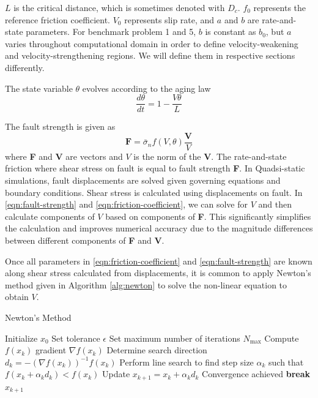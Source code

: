 $L$ is the critical distance, which is sometimes denoted with $D_c$. 
$f_0$ represents the reference friction coefficient. $V_0$ represents slip rate, and $a$ and $b$ are rate-and-state parameters. For benchmark problem 1 and 5, $b$ is constant as $b_0$, but $a$ varies throughout computational domain  in order to define velocity-weakening and velocity-strengthening regions. We will define them in respective sections differently. 

The state variable $\theta$ evolves according to the aging law
\begin{equation}
    \frac{d\theta}{dt} = 1 - \frac{V\theta}{L}
    \label{eqn:aging-law}
\end{equation}

The fault strength is given as 
\begin{equation}
    \textbf{F} = \bar{\sigma}_n f(V,\theta) \frac{\textbf{V}}{V}
    \label{eqn:fault-strength}
\end{equation}
where \textbf{F} and \textbf{V} are vectors and $V$ is the norm of the \textbf{V}.
The rate-and-state friction where shear stress on fault is equal to fault strength \textbf{F}.
In Quadsi-static simulations, fault displacements are solved given governing equations and boundary conditions. 
Shear stress is calculated using displacements on fault.
In \autoref{eqn:fault-strength} and \autoref{eqn:friction-coefficient}, we can solve for $V$ and then calculate components of $V$ based on components of \textbf{F}. 
This significantly simplifies the calculation and improves numerical accuracy due to the magnitude differences between different components of \textbf{F} and \textbf{V}.

Once all parameters in \autoref{eqn:friction-coefficient} and \autoref{eqn:fault-strength} are known along shear stress calculated from displacements, it is common to apply Newton's method given in Algorithm \autoref{alg:newton} to solve the non-linear equation to obtain $V$.
\begin{algorithm}
\caption{Newton's Method}
\begin{algorithmic}[1]
\State Initialize $x_0$
\State Set tolerance $\epsilon$
\State Set maximum number of iterations $N_{\max}$
    \State Compute $f(x_k)$ gradient $\nabla f(x_k)$
    \State Determine search direction $d_k = -(\nabla f(x_k))^{-1}f(x_k)$
    \State Perform line search to find step size $\alpha_k$ such that $f(x_k + \alpha_k d_k) < f(x_k)$
    \State Update $x_{k+1} = x_k + \alpha_k d_k$
        \State Convergence achieved
        \State \textbf{break}
    \EndIf
\EndFor
\Return $x_{k+1}$
\end{algorithmic}
\label{alg:newton}
\end{algorithm}

